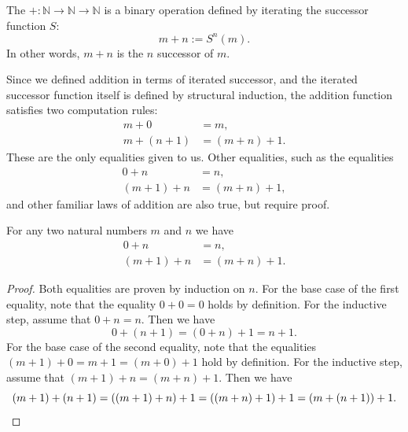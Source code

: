 \begin{definition}
  The  ${+}:\mathbb{N}\to\mathbb{N}\to\mathbb{N}$ is a binary operation defined by iterating the successor function $S$:
  \begin{equation*}
    m+n := S^n(m).
  \end{equation*}
  In other words, $m+n$ is the $n$\supth{} successor of $m$.
\end{definition}

\begin{remark}
  Since we defined addition in terms of iterated successor, and the iterated successor function itself is defined by structural induction, the addition function satisfies two computation rules:
  \begin{align*}
    m+0 & = m, \\
    m+(n+1) & = (m+n)+1.
  \end{align*}
  These are the only equalities given to us. Other equalities, such as the equalities
  \begin{align*}
    0+n & = n, \\
    (m+1)+n & = (m+n)+1,
  \end{align*}
  and other familiar laws of addition are also true, but require proof.
\end{remark}

\begin{proposition}\label{proposition:unit-law-addition-nat}
  For any two natural numbers $m$ and $n$ we have
  \begin{align*}
    0+n & = n, \\
    (m+1)+n & = (m+n)+1.
  \end{align*}
\end{proposition}

\begin{proof}
  Both equalities are proven by induction on $n$. For the base case of the first equality, note that the equality $0+0=0$ holds by definition. For the inductive step, assume that $0+n=n$. Then we have
  \begin{equation*}
    0+(n+1)=(0+n)+1= n+1.
  \end{equation*}
  For the base case of the second equality, note that the equalities $(m+1)+0=m+1=(m+0)+1$ hold by definition. For the inductive step, assume that $(m+1)+n=(m+n)+1$. Then we have
  \begin{equation*}
    (m+1)+(n+1)=((m+1)+n)+1=((m+n)+1)+1=(m+(n+1))+1.\qedhere
  \end{equation*}
\end{proof}

